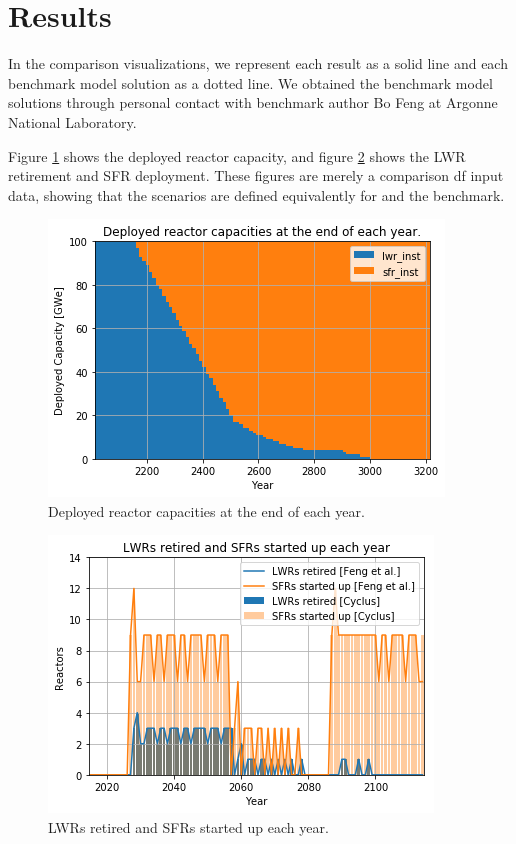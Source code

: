 \section{Results}

In the comparison visualizations, we represent each \Cyclus result as a solid 
line and each benchmark model solution as a dotted line. We obtained the benchmark 
model solutions through personal contact with benchmark author Bo Feng at Argonne 
National Laboratory.

Figure \ref{fig:pow_plot} shows the deployed reactor capacity, and
figure \ref{fig:dep} shows the \gls{LWR} retirement and \gls{SFR}
deployment. These figures are merely a comparison df
input data, showing that the scenarios are defined equivalently for
\Cyclus and the benchmark. 

\begin{figure}[htbp!]
    \begin{center}
        \includegraphics[scale=0.5]{./images/results_18/power_plot.png}
    \end{center}
        \caption{Deployed reactor capacities at the end of each year.}
    \label{fig:pow_plot}
\end{figure}


\begin{figure}[htbp!]
	\begin{center}
		\includegraphics[scale=0.5]{./images/results_18/dep.png}
	\end{center}
        \caption{\glspl{LWR} retired and \glspl{SFR} started up each year.}
	\label{fig:dep}
\end{figure}

